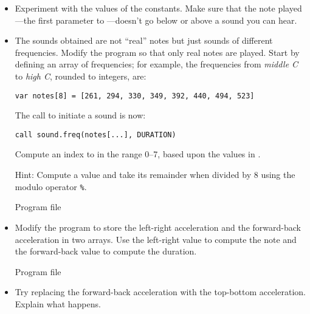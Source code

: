 \begin{itemize}
\item Experiment with the values of the constants. Make sure that
the note played---the first parameter
to ---doesn't go below or above a sound you can hear.

\item The sounds obtained are not ``real'' notes but just sounds of
different frequencies. Modify the program so that only real notes are played.
Start by defining an array of frequencies; for example, the frequencies
from \emph{middle C} to \emph{high C}, rounded to integers, are:
\begin{verbatim}
var notes[8] = [261, 294, 330, 349, 392, 440, 494, 523]
\end{verbatim}
The call to initiate a sound is now:
\begin{verbatim}
call sound.freq(notes[...], DURATION)
\end{verbatim}
Compute an index to  in the range 0--7, based upon the
values in .

Hint: Compute a value and take its remainder when divided by 8 using the modulo operator \verb+%+.

{\raggedleft \hfill Program file }

\item Modify the program to store the left-right acceleration and
the forward-back acceleration in two arrays. Use the left-right value
to compute the note and the forward-back value to compute the duration.

{\raggedleft \hfill Program file }

\item Try replacing the forward-back acceleration with the top-bottom
acceleration. Explain what happens.
\end{itemize}